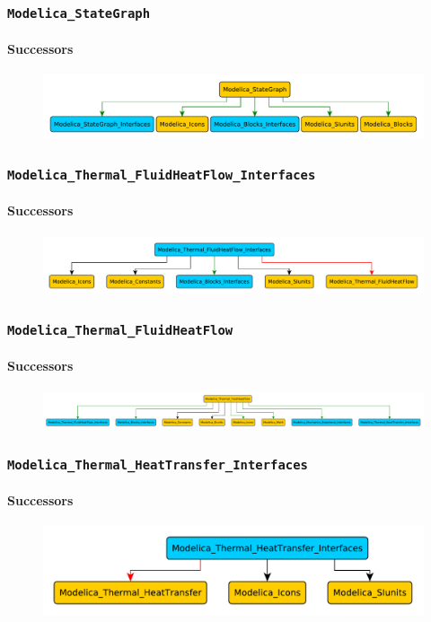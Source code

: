 \documentclass[aspectratio=1610]{beamer}
\begin{document}
\begin{frame}
  \frametitle{\texttt{Modelica\_StateGraph}}
  \framesubtitle{Successors}
  \begin{figure}
      \includegraphics[width=\textwidth]{Modelica_StateGraph}
  \end{figure}
\end{frame}

\begin{frame}
  \frametitle{\texttt{Modelica\_Thermal\_FluidHeatFlow\_Interfaces}}
  \framesubtitle{Successors}
  \begin{figure}
      \includegraphics[width=\textwidth]{Modelica_Thermal_FluidHeatFlow_Interfaces}
  \end{figure}
\end{frame}

\begin{frame}
  \frametitle{\texttt{Modelica\_Thermal\_FluidHeatFlow}}
  \framesubtitle{Successors}
  \begin{figure}
      \includegraphics[width=\textwidth]{Modelica_Thermal_FluidHeatFlow}
  \end{figure}
\end{frame}

\begin{frame}
  \frametitle{\texttt{Modelica\_Thermal\_HeatTransfer\_Interfaces}}
  \framesubtitle{Successors}
  \begin{figure}
      \includegraphics[width=\textwidth]{Modelica_Thermal_HeatTransfer_Interfaces}
  \end{figure}
\end{frame}
\end{document}
